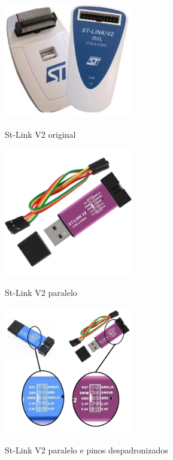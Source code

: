 \begin{figure}[ht]
	\centering
	\caption{St-Link V2 original}
	\includegraphics[width=0.5\textwidth]{figures/stlinkv2_original}	
    \label{stlinkv2_original}
\end{figure}


\begin{figure}[ht]
	\centering
	\caption{St-Link V2 paralelo}
	\includegraphics[width=0.5\textwidth]{figures/stlinkv2_cheap}	
    \label{stlinkv2_cheap}
\end{figure}


\begin{figure}[ht]
	\centering
	\caption{St-Link V2 paralelo e pinos despadronizados}
	\includegraphics[width=0.5\textwidth]{figures/stlinkv2_cheap_pin_diff}
    \label{stlinkv2_cheap_pin_diff}
\end{figure}

